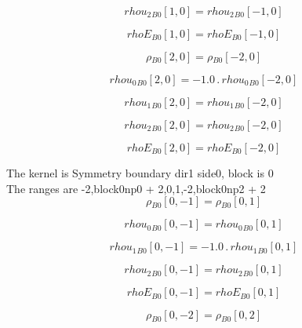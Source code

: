 \documentclass{article}
\begin{document}
\begin{dmath}{rhou_{2}{_{B0}}}[{1,0}] = {rhou_{2}{_{B0}}}[{-1,0}]\end{dmath}

\begin{dmath}{rhoE{_{B0}}}[{1,0}] = {rhoE{_{B0}}}[{-1,0}]\end{dmath}

\begin{dmath}{\rho{_{B0}}}[{2,0}] = {\rho{_{B0}}}[{-2,0}]\end{dmath}

\begin{dmath}{rhou_{0}{_{B0}}}[{2,0}] = - 1.0 \,.\, {rhou_{0}{_{B0}}}[{-2,0}]\end{dmath}

\begin{dmath}{rhou_{1}{_{B0}}}[{2,0}] = {rhou_{1}{_{B0}}}[{-2,0}]\end{dmath}

\begin{dmath}{rhou_{2}{_{B0}}}[{2,0}] = {rhou_{2}{_{B0}}}[{-2,0}]\end{dmath}

\begin{dmath}{rhoE{_{B0}}}[{2,0}] = {rhoE{_{B0}}}[{-2,0}]\end{dmath}

\noindent The kernel is Symmetry boundary dir1 side0, block is 0\\\noindent The ranges are -2,block0np0 + 2,0,1,-2,block0np2 + 2\\\begin{dmath}{\rho{_{B0}}}[{0,-1}] = {\rho{_{B0}}}[{0,1}]\end{dmath}

\begin{dmath}{rhou_{0}{_{B0}}}[{0,-1}] = {rhou_{0}{_{B0}}}[{0,1}]\end{dmath}

\begin{dmath}{rhou_{1}{_{B0}}}[{0,-1}] = - 1.0 \,.\, {rhou_{1}{_{B0}}}[{0,1}]\end{dmath}

\begin{dmath}{rhou_{2}{_{B0}}}[{0,-1}] = {rhou_{2}{_{B0}}}[{0,1}]\end{dmath}

\begin{dmath}{rhoE{_{B0}}}[{0,-1}] = {rhoE{_{B0}}}[{0,1}]\end{dmath}

\begin{dmath}{\rho{_{B0}}}[{0,-2}] = {\rho{_{B0}}}[{0,2}]\end{dmath}
\end{document}
